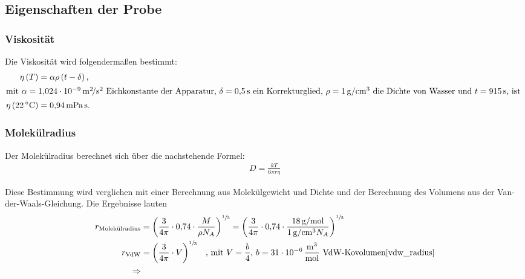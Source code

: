 \subsection{Eigenschaften der Probe}%
\label{sec:eigenschaften_der_probe}

\subsubsection{Viskosität}%
\label{sub:viskositaet}

Die Viskosität wird folgendermaßen bestimmt:
\begin{align}
  \nonumber
  \eta \left(T\right) &= \alpha \rho \left(t - \delta\right), \\
  \intertext{%
    mit $\alpha = \SI[]{1.024e-09}{\meter\squared\per\second\squared}$ Eichkonstante der Apparatur,
    $\delta = \SI[]{0.5}{\second}$ ein Korrekturglied,
    $\rho = \SI[]{1.0}{\gram\per\centi\meter\cubed}$ die Dichte von Wasser
    und $t = \SI{915}{\second}$, ist
  }
  \label{eq:viskositaet}
  \eta \left(\SI{22}{\celsius}\right)&= \SI[]{0.94}{\milli\pascal\second}.
\end{align}

\subsubsection{Molekülradius}%
\label{sub:molekuelradius}
Der Molekülradius berechnet sich über die nachstehende Formel:
\begin{align}
  \label{eq:molekuelradius}
  D = \frac{k T}{6 \pi r \eta}
\end{align}

Diese Bestimmung wird verglichen mit einer Berechnung aus Molekülgewicht und Dichte
und der Berechnung des Volumens aus der Van-der-Waals-Gleichung.
Die Ergebnisse lauten
\begin{align*}
  r_\text{Molekülradius}
    &= {\left(\frac{3}{4\pi} \cdot \num{0.74} \cdot \frac{M}{\rho N_A}\right)}^{\sfrac{1}{3}}
     = {\left(\frac{3}{4\pi} \cdot \num{0.74} \cdot \frac{\SI{18}{\gram\per\mole}}{\SI{1}{\gram\per\centi\meter\tothe3} N_A}\right)}^{\sfrac{1}{3}} \\
  r_\text{VdW}
    &= {\left(\frac{3}{4 \pi} \cdot V\right)}^{\sfrac{1}{3}}
    \hspace{1em}\text{, mit } V = \frac{b}{4} \text{, $b = \SI{31e-6}{\meter\tothe3\per\mol}$ VdW-Kovolumen\cite{vdw_radius}} \\
  \Rightarrow
  
\end{align*}
